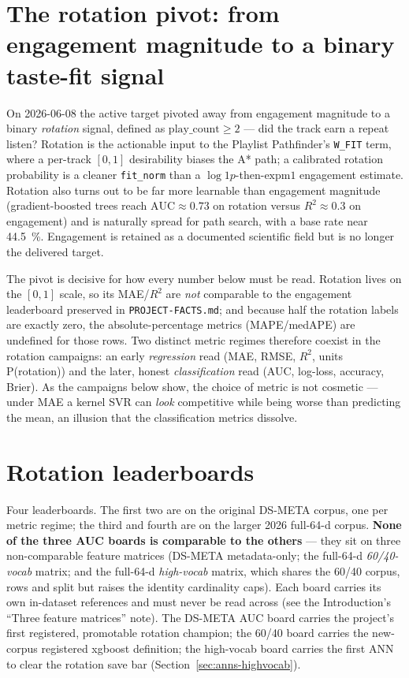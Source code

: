 \documentclass[11pt]{article}
\newcommand{\medape}{medAPE}
\newcommand{\rsq}{$R^2$}
\begin{document}
\section{The rotation pivot: from engagement magnitude to a binary taste-fit signal}
\label{sec:rotation-pivot}
On 2026-06-08 the active target pivoted away from engagement magnitude to a
binary \emph{rotation} signal, defined as $\text{play\_count} \ge 2$ --- did
the track earn a repeat listen? Rotation is the actionable input to the
Playlist Pathfinder's \texttt{W\_FIT} term, where a per-track $[0,1]$
desirability biases the A* path; a calibrated rotation probability is a
cleaner \texttt{fit\_norm} than a $\log1p$-then-$\text{expm1}$ engagement
estimate. Rotation also turns out to be far more learnable than engagement
magnitude (gradient-boosted trees reach $\text{AUC}\approx 0.73$ on rotation
versus \rsq{}$\approx 0.3$ on engagement) and is naturally spread for path
search, with a base rate near \SI{44.5}{\percent}. Engagement is retained as a
documented scientific field but is no longer the delivered target.

The pivot is decisive for how every number below must be read. Rotation lives
on the $[0,1]$ scale, so its MAE/\rsq{} are \emph{not} comparable to the
engagement leaderboard preserved in \texttt{PROJECT-FACTS.md}; and because half
the rotation labels are exactly zero, the absolute-percentage metrics
(MAPE/\medape{}) are undefined for those rows. Two distinct metric regimes
therefore coexist in the rotation campaigns: an early \emph{regression} read
(MAE, RMSE, \rsq{}, units P(rotation)) and the later, honest
\emph{classification} read (AUC, log-loss, accuracy, Brier). As the campaigns
below show, the choice of metric is not cosmetic --- under MAE a kernel SVR can
\emph{look} competitive while being worse than predicting the mean, an illusion
that the classification metrics dissolve.

\section{Rotation leaderboards}
\label{sec:leaderboard}
Four leaderboards. The first two are on the original DS-META corpus, one per
metric regime; the third and fourth are on the larger 2026 full-64-d corpus.
\textbf{None of the three AUC boards is comparable to the others} --- they sit
on three non-comparable feature matrices (DS-META metadata-only; the full-64-d
\emph{60/40-vocab} matrix; and the full-64-d \emph{high-vocab} matrix, which
shares the 60/40 corpus, rows and split but raises the identity cardinality
caps). Each board carries its own in-dataset references and must never be read
across (see the Introduction's ``Three feature matrices'' note). The DS-META
AUC board carries the project's first registered, promotable rotation champion;
the 60/40 board carries the new-corpus registered xgboost definition; the
high-vocab board carries the first ANN to clear the rotation save bar
(Section~\ref{sec:anns-highvocab}).
\end{document}
